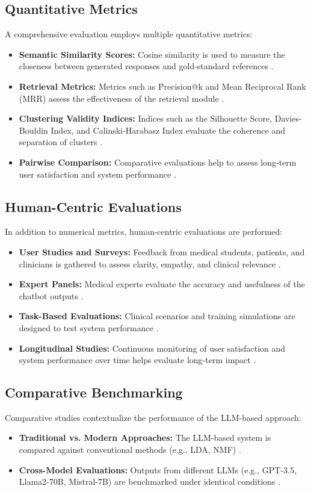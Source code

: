 \subsection{Quantitative Metrics}
A comprehensive evaluation employs multiple quantitative metrics:
\begin{itemize}[itemsep=2em]
    \item \textbf{Semantic Similarity Scores:} Cosine similarity is used to measure the closeness between generated responses and gold-standard references \cite{koopman2020}.
    \item \textbf{Retrieval Metrics:} Metrics such as Precision@k and Mean Reciprocal Rank (MRR) assess the effectiveness of the retrieval module \cite{qiu2023}.
    \item \textbf{Clustering Validity Indices:} Indices such as the Silhouette Score, Davies-Bouldin Index, and Calinski-Harabasz Index evaluate the coherence and separation of clusters \cite{tabak2014}.
    \item \textbf{Pairwise Comparison:} Comparative evaluations help to assess long-term user satisfaction and system performance \cite{dhurandhar2024}.
\end{itemize}

\subsection{Human-Centric Evaluations}
In addition to numerical metrics, human-centric evaluations are performed:
\begin{itemize}[itemsep=2em]
    \item \textbf{User Studies and Surveys:} Feedback from medical students, patients, and clinicians is gathered to assess clarity, empathy, and clinical relevance \cite{dineen2019}.
    \item \textbf{Expert Panels:} Medical experts evaluate the accuracy and usefulness of the chatbot outputs \cite{editorial2023}.
    \item \textbf{Task-Based Evaluations:} Clinical scenarios and training simulations are designed to test system performance \cite{montagna2023}.
    \item \textbf{Longitudinal Studies:} Continuous monitoring of user satisfaction and system performance over time helps evaluate long-term impact \cite{singh2023}.
\end{itemize}

\subsection{Comparative Benchmarking}
Comparative studies contextualize the performance of the LLM-based approach:
\begin{itemize}[itemsep=2em]
    \item \textbf{Traditional vs. Modern Approaches:} The LLM-based system is compared against conventional methods (e.g., LDA, NMF) \cite{hernandez2021}.
    \item \textbf{Cross-Model Evaluations:} Outputs from different LLMs (e.g., GPT-3.5, Llama2-70B, Mistral-7B) are benchmarked under identical conditions \cite{mistral7b}.
\end{itemize}

